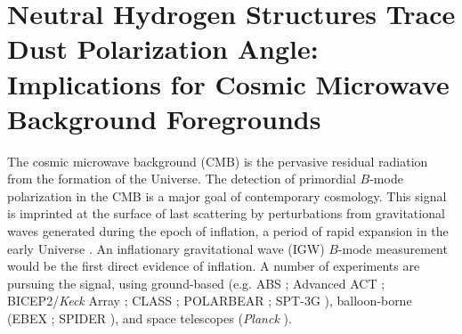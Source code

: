 \chapter[Neutral Hydrogen Structures Trace Dust Polarization Angle: Implications for Cosmic Microwave Background Foregrounds]{Neutral Hydrogen Structures Trace Dust Polarization Angle: Implications for Cosmic Microwave Background Foregrounds\label{ch:foregrounds}}
\let\thefootnote\relax{}


\begin{abstract}
Using high-resolution data from the Galactic Arecibo L-Band Feed Array HI (GALFA-\HI) survey, we show that linear structure in Galactic neutral hydrogen (\HI) correlates with the magnetic field orientation implied by \textit{Planck} 353 GHz polarized dust emission. The structure of the neutral interstellar medium is more tightly coupled to the magnetic field than previously known. At high Galactic latitudes, where the \textit{Planck} data are noise-dominated, the \hi data provide an independent constraint on the Galactic magnetic field orientation, and hence the local dust polarization angle. We detect strong cross-correlations between template maps constructed from estimates of dust intensity combined with either \HI-derived angles, starlight polarization angles, or \textit{Planck} 353 GHz angles. The \hi data thus provide a new tool in the search for inflationary gravitational wave $B$-mode polarization in the cosmic microwave background, which is currently limited by dust foreground contamination. 
\end{abstract} 


The cosmic microwave background (CMB) is the pervasive residual radiation from the formation of the Universe. The detection of primordial $B$-mode polarization in the CMB is a major goal of contemporary cosmology. 
This signal is imprinted at the surface of last scattering by perturbations from gravitational waves generated during the epoch of inflation, a period of rapid expansion in the early Universe \cite{1997PhRvL..78.2054S, 1997ApJ...482....6S, Kamionkowski:1997hq}. An inflationary gravitational wave (IGW) $B$-mode measurement would be the first direct evidence of inflation. A number of experiments are pursuing the signal, using ground-based (e.g. ABS \cite{EssingerHileman:2010uf}; Advanced ACT \cite{Niemack:2010fk}; BICEP2/\textit{Keck} Array \cite{Ade:2015wh}; CLASS \cite{EssingerHileman:2014wg}; POLARBEAR \cite{Kermish:2012wh}; SPT-3G \cite{Benson:2014br}), balloon-borne (EBEX \cite{ReichbornKjennerud:2010vb}; SPIDER \cite{Fraisse:2011jv}), and space telescopes (\textit{Planck} \cite{Collaboration:2015tu}). 

